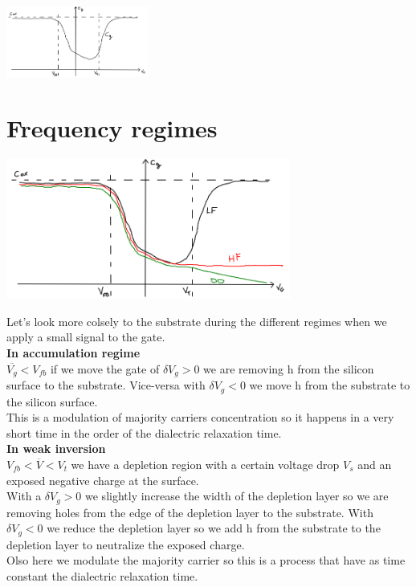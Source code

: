 \centering
\includegraphics[width=0.35\textwidth]{c-g1.png}\\
\raggedright



\section{Frequency regimes}
\centering
\includegraphics[width=0.7\textwidth]{c-gtot.png}\\
\raggedright

Let's look more colsely to the substrate during the different regimes when we apply a small signal to the gate.\\

\vspace{5mm}
{\bf In accumulation regime}\\
$\overline{V_g}<V_{fb}$ if we move the gate of $\delta V_g>0$ we are removing h from the silicon surface to the substrate. Vice-versa with $\delta V_g<0$ we move h from the substrate to the silicon surface.\\
This is a modulation of majority carriers concentration so it happens in a very short time in the order of the dialectric relaxation time.\\

\vspace{5mm}
{\bf In weak inversion}\\
$V_{fb}<\overline{V}<V_t$ we have a depletion region with a certain voltage drop $V_s$ and an exposed negative charge at the surface.\\
With a $\delta V_g>0$ we slightly increase the width of the depletion layer so we are removing holes from the edge of the depletion layer to the substrate. With $\delta V_g<0$ we reduce the depletion layer so we add h from the substrate to the depletion layer to neutralize the exposed charge.\\
Olso here we modulate the majority carrier so this is a process that have as time constant the dialectric relaxation time.\\

